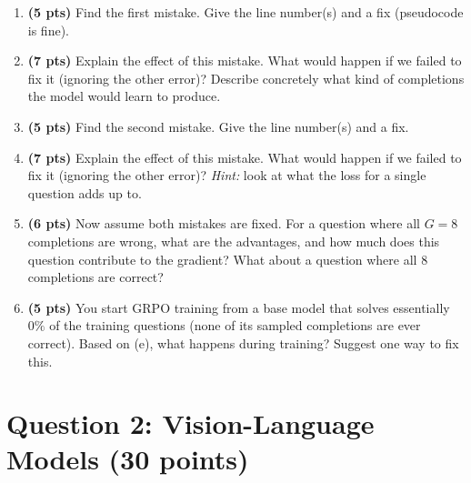 \documentclass[11pt]{article}
\begin{document}
\begin{enumerate}[label=(\alph*)]

  \item \textbf{(5 pts)} Find the first mistake. Give the line number(s) and a fix (pseudocode is fine).

  \item \textbf{(7 pts)} Explain the effect of this mistake. What would happen if we failed to fix it (ignoring
  the other error)? Describe concretely what kind of completions the model would learn to produce.

  \item \textbf{(5 pts)} Find the second mistake. Give the line number(s) and a fix.

  \item \textbf{(7 pts)} Explain the effect of this mistake. What would happen if we failed to fix it (ignoring
  the other error)? \emph{Hint:} look at what the loss for a single question adds up to.

  \item \textbf{(6 pts)} Now assume both mistakes are fixed. For a question where all $G = 8$ completions are
  wrong, what are the advantages, and how much does this question contribute to the gradient? What about a
  question where all $8$ completions are correct?

  \item \textbf{(5 pts)} You start GRPO training from a base model that solves essentially $0\%$ of the training
  questions (none of its sampled completions are ever correct). Based on (e), what happens during training?
  Suggest one way to fix this.

\end{enumerate}

\section{Question 2: Vision-Language Models (30 points)}
\end{document}
